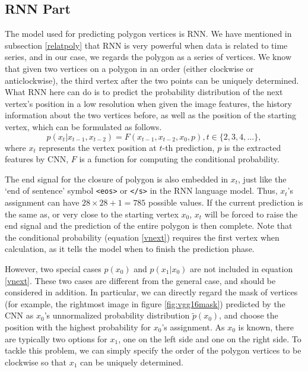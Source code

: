 \subsection{RNN Part}\label{modrnn}
The model used for predicting polygon vertices is RNN. We have mentioned in subsection \ref{relatpoly} that RNN is very powerful when data is related to time series, and in our case, we regards the polygon as a series of vertices. We know that given two vertices on a polygon in an order (either clockwise or anticlockwise), the third vertex after the two points can be uniquely determined. What RNN here can do is to predict the probability distribution of the next vertex's position in a low resolution when given the image features, the history information about the two vertices before, as well as the position of the starting vertex, which can be formulated as follows.
\begin{equation}\label{vnext}
	p(x_t|x_{t-1}, x_{t-2}) = F(x_{t-1}, x_{t-2}, x_{0}, p), t \in \{2,3,4,...\},
\end{equation}
where $x_t$ represents the vertex position at $t$-th prediction, $p$ is the extracted features by CNN, $F$ is a function for computing the conditional probability.

The end signal for the closure of polygon is also embedded in $x_t$, just like the `end of sentence' symbol \lstinline{<eos>} or \lstinline{</s>} in the RNN language model. Thus, $x_t$'s assignment can have $28\times28+1=785$ possible values. If the current prediction is the same as, or very close to the starting vertex $x_0$, $x_t$ will be forced to raise the end signal and the prediction of the entire polygon is then complete. Note that the conditional probability (equation \ref{vnext}) requires the first vertex when calculation, as it tells the model when to finish the prediction phase.

However, two special cases $p(x_0)$ and $p(x_1|x_0)$ are not included in equation \ref{vnext}. These two cases are different from the general case, and should be considered in addition. In particular, we can directly regard the mask of vertices (for example, the rightmost image in figure \ref{fig:vgg16mask}) predicted by the CNN as $x_0$'s unnormalized probability distribution $\tilde{p}(x_0)$, and choose the position with the highest probability for $x_0$'s assignment. As $x_0$ is known, there are typically two options for $x_1$, one on the left side and one on the right side. To tackle this problem, we can simply specify the order of the polygon vertices to be clockwise so that $x_1$ can be uniquely determined.

